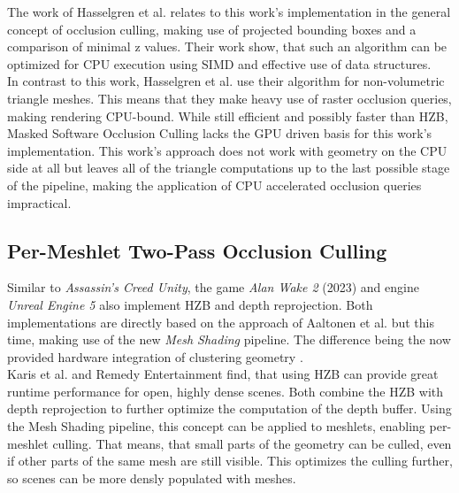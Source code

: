 \noindent
The work of Hasselgren et al. relates to this work's implementation in the general concept of occlusion culling, making 
use of projected bounding boxes and a comparison of minimal z values. Their work show, that such an algorithm can be 
optimized for \ac{CPU} execution using \ac{SIMD} and effective use of data structures. \\

\noindent 
In contrast to this work, Hasselgren et al. use their algorithm for non-volumetric triangle meshes. This means that 
they make heavy use of raster occlusion queries, making rendering CPU-bound. While still efficient and possibly faster 
than \ac{HZB}, Masked Software Occlusion Culling lacks the \ac{GPU} driven basis for this work's implementation. This 
work's approach does not work with geometry on the \ac{CPU} side at all but leaves all of the triangle computations up 
to the last possible stage of the pipeline, making the application of \ac{CPU} accelerated occlusion queries impractical.


\subsection*{Per-Meshlet Two-Pass Occlusion Culling}

Similar to \emph{Assassin's Creed Unity}, the game \emph{Alan Wake 2} (2023) and engine \emph{Unreal Engine 5} also 
implement \ac{HZB} and depth reprojection. Both implementations are directly based on the approach of Aaltonen et 
al. \cite{Aaltonen2015} but this time, making use of the new \emph{Mesh Shading} pipeline. The difference being the 
now provided hardware integration of clustering geometry \cite{Remedy2023,Karis2021}.  \\

\noindent
Karis et al. and Remedy Entertainment find, that using \ac{HZB} can provide great runtime performance for open, 
highly dense scenes. Both combine the \ac{HZB} with depth reprojection to further optimize the computation of the 
depth buffer. Using the Mesh Shading pipeline, this concept can be applied to meshlets, enabling per-meshlet culling. 
That means, that small parts of the geometry can be culled, even if other parts of the same mesh are still visible. 
This optimizes the culling further, so scenes can be more densly populated with meshes.\\


